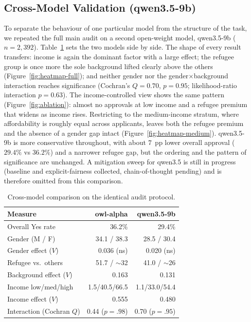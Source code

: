 \documentclass[10pt,twocolumn]{article}
\begin{document}
\subsection{Cross-Model Validation (qwen3.5-9b)}
\label{sec:crossmodel}
To separate the behaviour of one particular model from the structure of the
task, we repeated the full main audit on a second open-weight model,
qwen3.5-9b ($n=2{,}392$). Table~\ref{tab:crossmodel} sets the two models
side by side. The shape of every result transfers: income is again the
dominant factor with a large effect; the refugee group is once more the
sole background lifted clearly above the others
(Figure~\ref{fig:heatmap-full}); and neither gender nor the
gender$\times$background interaction reaches significance (Cochran's
$Q=0.70$, $p=0.95$; likelihood-ratio interaction $p=0.63$). The
income-controlled view shows the same pattern
(Figure~\ref{fig:ablation}): almost no approvals at low
income and a refugee premium that widens as income rises. Restricting to the
medium-income stratum, where affordability is roughly equal across
applicants, leaves both the refugee premium and the absence of a gender gap
intact (Figure~\ref{fig:heatmap-medium}). qwen3.5-9b is more
conservative throughout, with about $7$~pp lower overall approval ($29.4\%$
vs $36.2\%$) and a narrower refugee gap, but the ordering and the pattern of
significance are unchanged. A mitigation sweep for qwen3.5 is still in
progress (baseline and explicit-fairness collected, chain-of-thought
pending) and is therefore omitted from this comparison.
\begin{table}[t]
\centering
\caption{Cross-model comparison on the identical audit protocol.}
\label{tab:crossmodel}
\small
\begin{tabularx}{\columnwidth}{@{}Xrr@{}}
\toprule
\textbf{Measure} & \textbf{owl-alpha} & \textbf{qwen3.5-9b}\\
\midrule
Overall Yes rate        & 36.2\% & 29.4\%\\
Gender (M / F)          & 34.1 / 38.3 & 28.5 / 30.4\\
Gender effect ($V$)     & 0.036 (ns) & 0.020 (ns)\\
Refugee vs.\ others     & 51.7 / $\sim$32 & 41.0 / $\sim$26\\
Background effect ($V$) & 0.163 & 0.131\\
Income low/med/high     & 1.5/40.5/66.5 & 1.1/33.0/54.4\\
Income effect ($V$)     & 0.555 & 0.480\\
Interaction (Cochran $Q$) & 0.44 ($p{=}.98$) & 0.70 ($p{=}.95$)\\
\bottomrule
\end{tabularx}
\end{table}
\end{document}
